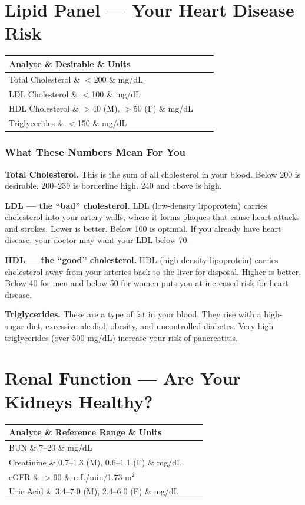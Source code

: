 \clearpage
\section{Lipid Panel --- Your Heart Disease Risk}

\begin{longtable}{@{}lll@{}}
\toprule
\textbf{Analyte} \& \textbf{Desirable} \& \textbf{Units} \\
\midrule
Total Cholesterol \& $<$200 \& mg/dL \\
LDL Cholesterol \& $<$100 \& mg/dL \\
HDL Cholesterol \& $>$40 (M), $>$50 (F) \& mg/dL \\
Triglycerides \& $<$150 \& mg/dL \\
\bottomrule
\end{longtable}

\subsubsection{What These Numbers Mean For You}

\textbf{Total Cholesterol.} This is the sum of all cholesterol in your blood. Below 200 is desirable. 200--239 is borderline high. 240 and above is high.

\textbf{LDL --- the ``bad'' cholesterol.} LDL (low-density lipoprotein) carries cholesterol into your artery walls, where it forms plaques that cause heart attacks and strokes. Lower is better. Below 100 is optimal. If you already have heart disease, your doctor may want your LDL below 70.

\textbf{HDL --- the ``good'' cholesterol.} HDL (high-density lipoprotein) carries cholesterol away from your arteries back to the liver for disposal. Higher is better. Below 40 for men and below 50 for women puts you at increased risk for heart disease.

\textbf{Triglycerides.} These are a type of fat in your blood. They rise with a high-sugar diet, excessive alcohol, obesity, and uncontrolled diabetes. Very high triglycerides (over 500 mg/dL) increase your risk of pancreatitis.

\clearpage
\section{Renal Function --- Are Your Kidneys Healthy?}

\begin{longtable}{@{}lll@{}}
\toprule
\textbf{Analyte} \& \textbf{Reference Range} \& \textbf{Units} \\
\midrule
BUN \& 7--20 \& mg/dL \\
Creatinine \& 0.7--1.3 (M), 0.6--1.1 (F) \& mg/dL \\
eGFR \& $>$90 \& mL/min/1.73 m$^2$ \\
Uric Acid \& 3.4--7.0 (M), 2.4--6.0 (F) \& mg/dL \\
\bottomrule
\end{longtable}

